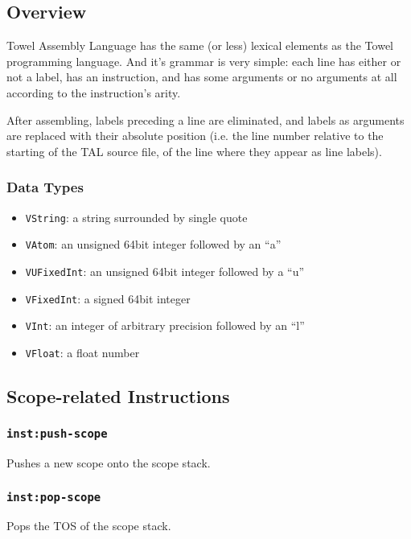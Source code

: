 \documentclass{article}
\newcommand{\inst}[1] {\texttt{inst:#1}}
\begin{document}
\subsection{Overview}

Towel Assembly Language has the same (or less) lexical elements as the Towel programming language. And it's grammar is very simple: each line has either or not a label, has an instruction, and has some arguments or no arguments at all according to the instruction's arity.

After assembling, labels preceding a line are eliminated, and labels as arguments are replaced with their absolute position (i.e. the line number relative to the starting of the TAL source file, of the line where they appear as line labels).

\subsubsection{Data Types}

\begin{itemize}
\item \texttt{VString}: a string surrounded by single quote
\item \texttt{VAtom}: an unsigned 64bit integer followed by an ``a''
\item \texttt{VUFixedInt}: an unsigned 64bit integer followed by a ``u''
\item \texttt{VFixedInt}: a signed 64bit integer
\item \texttt{VInt}: an integer of arbitrary precision followed by an ``l''
\item \texttt{VFloat}: a float number
\end{itemize}

\subsection{Scope-related Instructions}

\subsubsection{\inst{push-scope}}

Pushes a new scope onto the scope stack.

\subsubsection{\inst{pop-scope}}

Pops the TOS of the scope stack.
\end{document}
